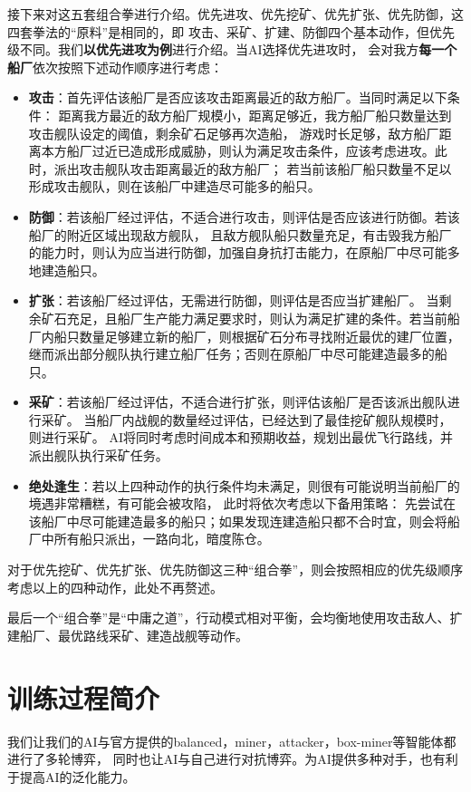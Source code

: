\documentclass[10pt]{article}
\begin{document}
接下来对这五套组合拳进行介绍。优先进攻、优先挖矿、优先扩张、优先防御，这四套拳法的“原料”是相同的，即
攻击、采矿、扩建、防御四个基本动作，但优先级不同。我们\textbf{以优先进攻为例}进行介绍。当AI选择优先进攻时，
会对我方\textbf{每一个船厂}依次按照下述动作顺序进行考虑：
\begin{itemize}
	\item \textbf{攻击}：首先评估该船厂是否应该攻击距离最近的敌方船厂。当同时满足以下条件：
		距离我方最近的敌方船厂规模小，距离足够近，我方船厂船只数量达到攻击舰队设定的阈值，剩余矿石足够再次造船，
		游戏时长足够，敌方船厂距离本方船厂过近已造成形成威胁，则认为满足攻击条件，应该考虑进攻。此时，派出攻击舰队攻击距离最近的敌方船厂；
		若当前该船厂船只数量不足以形成攻击舰队，则在该船厂中建造尽可能多的船只。

	\item \textbf{防御}：若该船厂经过评估，不适合进行攻击，则评估是否应该进行防御。若该船厂的附近区域出现敌方舰队，
		且敌方舰队船只数量充足，有击毁我方船厂的能力时，则认为应当进行防御，加强自身抗打击能力，在原船厂中尽可能多地建造船只。
	
	\item \textbf{扩张}：若该船厂经过评估，无需进行防御，则评估是否应当扩建船厂。
		当剩余矿石充足，且船厂生产能力满足要求时，则认为满足扩建的条件。若当前船厂内船只数量足够建立新的船厂，则根据矿石分布寻找附近最优的建厂位置，
		继而派出部分舰队执行建立船厂任务；否则在原船厂中尽可能建造最多的船只。
	
	\item \textbf{采矿}：若该船厂经过评估，不适合进行扩张，则评估该船厂是否该派出舰队进行采矿。
		当船厂内战舰的数量经过评估，已经达到了最佳挖矿舰队规模时，则进行采矿。
		AI将同时考虑时间成本和预期收益，规划出最优飞行路线，并派出舰队执行采矿任务。
	
	\item \textbf{绝处逢生}：若以上四种动作的执行条件均未满足，则很有可能说明当前船厂的境遇非常糟糕，有可能会被攻陷，
		此时将依次考虑以下备用策略：
		先尝试在该船厂中尽可能建造最多的船只；如果发现连建造船只都不合时宜，则会将船厂中所有船只派出，一路向北，暗度陈仓。
\end{itemize}
对于优先挖矿、优先扩张、优先防御这三种“组合拳”，则会按照相应的优先级顺序考虑以上的四种动作，此处不再赘述。

最后一个“组合拳”是“中庸之道”，行动模式相对平衡，会均衡地使用攻击敌人、扩建船厂、最优路线采矿、建造战舰等动作。

\section{训练过程简介}
我们让我们的AI与官方提供的balanced，miner，attacker，box-miner等智能体都进行了多轮博弈，
同时也让AI与自己进行对抗博弈。为AI提供多种对手，也有利于提高AI的泛化能力。
\end{document}
